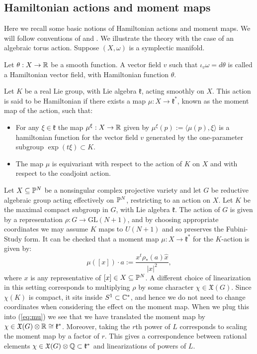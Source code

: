 \subsection{Hamiltonian actions and moment maps} \label{basics:momentmaps}
Here we recall some basic notions of Hamiltonian actions and moment maps. We will follow conventions of \cite{da2006symplectic} and \cite{berman2014complex}. We illustrate the theory with the case of an algebraic torus action. Suppose \((X,\omega)\) is a symplectic manifold.
\begin{definition}
Let \(\theta: X \to \mathbb{R}\) be a smooth function. A vector field \(v\) such that  \(\iota_v \omega = d \theta\) is called a Hamiltonian vector field, with Hamiltonian function \(\theta\). 
\end{definition}
\begin{definition}
Let \(K\) be a real Lie group, with Lie algebra \(\mathfrak{k}\), acting smoothly on \(X\). This action is said to be Hamiltonian if there exists a map \(\mu: X \to \mathfrak{k}^*\), known as the moment map of the action, such that:
\begin{itemize}
\item For any \(\xi \in \mathfrak{k}\) the map \(\mu^\xi : X \to \mathbb{R}\) given by \(\mu^\xi(p) := \langle \mu(p), \xi \rangle \) is a hamiltonian function for the vector field \(v\) generated by the one-parameter subgroup \(\exp(t \xi) \subset K\).
\item The map \(\mu\) is equivariant with respect to the action of \(K\) on \(X\) and with respect to the coadjoint action.
\end{itemize}
\end{definition}
\begin{example}
Let \(X \subseteq \mathbb{P}^N\) be a nonsingular complex projective variety and let \(G\) be reductive algebraic group acting effectively on \(\mathbb{P}^N\), restricting to an action on \(X\). Let \(K\) be the maximal compact subgroup in \(G\), with Lie algebra \(\mathfrak{k}\). The action of \(G\) is given by a representation \(\rho: G \to \text{GL}(N+1)\), and by choosing appropriate coordinates we may assume \(K\) maps to \(U(N+1)\) and so preserves the Fubini-Study form. It can be checked that a moment map \(\mu: X \to \mathfrak{k}^*\) for the \(K\)-action is given by:
\begin{equation}\label{eq:mu}
\mu([x]) \cdot a := \frac{x^t \rho_*(a) \hat{x}}{ |x|^2},
\end{equation}
where \(x\) is any representative of \([x] \in X \subseteq \mathbb{P}^N\). A different choice of linearization in this setting corresponds to multiplying \(\rho\) by some character \(\chi \in \mathfrak{X}(G)\). Since \(\chi(K)\) is compact, it sits inside \(S^1 \subset \mathbb{C}^*\), and hence we do not need to change coordinates when considering the effect on the moment map. When we plug this into (\ref{eq:mu}) we see that we have translated the moment map by \(\chi \in \mathfrak{X}(G) \otimes \mathbb{R} \cong \mathfrak{k}^*\). Moreover, taking the \(r\)th power of \(L\) corresponds to scaling the moment map by a factor of \(r\). This gives a correspondence between rational elements \(\chi \in \mathfrak{X}(G) \otimes \mathbb{Q} \subset \mathfrak{k}^*\) and linearizations of powers of \(L\).
\end{example}
